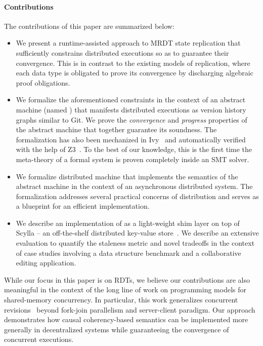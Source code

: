 \paragraph{Contributions} The contributions of this paper are summarized
below:
\begin{itemize}
  \item We present a runtime-assisted approach to MRDT state
    replication that sufficiently constrains distributed executions so
    as to guarantee their convergence. This is in contrast to the
    existing models of replication, where each data type is obligated
    to prove its convergence by discharging algebraic proof
    obligations.

  \item We formalize the aforementioned constraints in the context of
    an abstract machine (named \quark) that manifests distributed
    executions as version history graphs similar to Git.  We prove the
    \emph{convergence} and \emph{progress} properties of the \quark
    abstract machine that together guarantee its soundness. The
    formalization has also been mechanized in Ivy~\cite{ivy} and
    automatically verified with the help of Z3~\cite{z3}. To the best
    of our knowledge, this is the first time the meta-theory of a
    formal system is proven completely inside an SMT solver.

  \item We formalize \quark distributed machine that implements the
    semantics of the \quark abstract machine in the context of an
    asynchronous distributed system. The formalization addresses
    several practical concerns of distribution and serves as a
    blueprint for an efficient implementation.

  \item We describe an implementation of \quark as a light-weight shim
    layer on top of Scylla -- an off-the-shelf distributed key-value
    store~\cite{scylla}. We describe an extensive evaluation to
    quantify the staleness metric and novel tradeoffs in the context
    of case studies involving a data structure benchmark and a
    collaborative editing application. 
\end{itemize}

While our focus in this paper is on RDTs, we believe our contributions
are also meaningful in the context of the long line of work on
programming models for shared-memory concurrency. In particular, this
work generalizes concurrent revisions~\cite{BBL+10} beyond fork-join
parallelism and server-client paradigm. Our approach demonstrates how
causal coherency-based semantics can be implemented more generally in
decentralized systems while guaranteeing the convergence of concurrent
executions.


